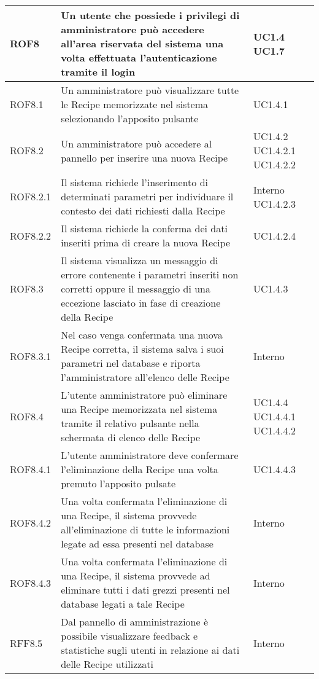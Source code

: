 \begin{center}
\begin{longtable}{| p{2cm} | p{8cm} | p{2cm} |}
		ROF8  &  Un utente che possiede i privilegi di amministratore può accedere all'area riservata del sistema una volta effettuata l'autenticazione tramite il login  &  UC1.4 \newline UC1.7 \\
		\hline
		ROF8.1  &  Un amministratore può visualizzare tutte le Recipe memorizzate nel sistema selezionando l'apposito pulsante  &  UC1.4.1 \\
		\hline
		ROF8.2  &  Un amministratore può accedere al pannello per inserire una nuova Recipe  &  UC1.4.2 \newline UC1.4.2.1 \newline UC1.4.2.2  \\
		\hline
		ROF8.2.1  &  Il sistema richiede l'inserimento di determinati parametri per individuare il contesto dei dati richiesti dalla Recipe  &  Interno \newline UC1.4.2.3 \\
		\hline
		ROF8.2.2  &  Il sistema richiede la conferma dei dati inseriti prima di creare la nuova Recipe  &  UC1.4.2.4 \\
		\hline
		ROF8.3  &  Il sistema visualizza un messaggio di errore contenente i parametri inseriti non corretti oppure il messaggio di una eccezione lasciato in fase di creazione della Recipe  &  UC1.4.3 \\
		\hline
		ROF8.3.1  &  Nel caso venga confermata  una nuova Recipe corretta, il sistema salva i suoi parametri nel database  e riporta l'amministratore all'elenco delle Recipe  &  Interno \\
		\hline
		ROF8.4  &  L'utente amministratore può eliminare una Recipe memorizzata nel sistema tramite il relativo pulsante nella schermata di elenco delle Recipe  &  UC1.4.4 \newline UC1.4.4.1 \newline UC1.4.4.2 \\
		\hline
		ROF8.4.1  &  L'utente amministratore deve confermare l'eliminazione della Recipe una volta premuto l'apposito pulsate  &  UC1.4.4.3 \\
		\hline
		ROF8.4.2  &  Una volta confermata l'eliminazione di una Recipe, il sistema provvede all'eliminazione di tutte le informazioni legate ad essa presenti nel database  &  Interno \\
		\hline
		ROF8.4.3  &  Una volta confermata l'eliminazione di una Recipe, il sistema provvede ad eliminare tutti i dati grezzi presenti nel database legati a tale Recipe  &  Interno \\
		\hline
		RFF8.5  &  Dal pannello di amministrazione è possibile visualizzare feedback e statistiche sugli utenti in relazione ai dati delle Recipe utilizzati  &  Interno \\
		\hline



\end{longtable}
\end{center}
